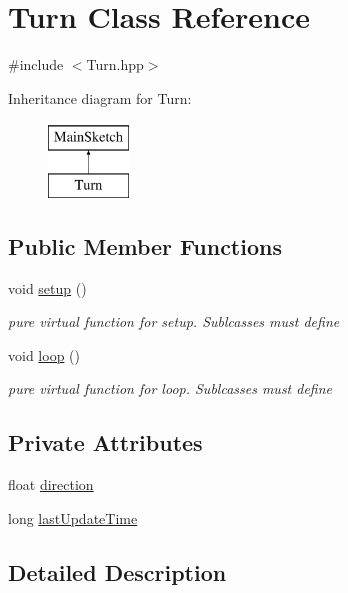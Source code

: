 \hypertarget{classTurn}{\section{Turn Class Reference}
\label{classTurn}
}


{\ttfamily \#include $<$Turn.\-hpp$>$}

Inheritance diagram for Turn\-:\begin{figure}[H]
\begin{center}
\leavevmode
\includegraphics[height=2.000000cm]{classTurn}
\end{center}
\end{figure}
\subsection*{Public Member Functions}
\begin{DoxyCompactItemize}
\item 
void \hyperlink{classTurn_a8fdb6293836d60fb74c5b4d147050373}{setup} ()
\begin{DoxyCompactList}\small\item\em pure virtual function for setup. Sublcasses must define \end{DoxyCompactList}\item 
void \hyperlink{classTurn_ae13f2a047c9ab7e4d4043c568d2fa5e3}{loop} ()
\begin{DoxyCompactList}\small\item\em pure virtual function for loop. Sublcasses must define \end{DoxyCompactList}\end{DoxyCompactItemize}
\subsection*{Private Attributes}
\begin{DoxyCompactItemize}
\item 
float \hyperlink{classTurn_a389aaac2be62ab0a1ab03d729c664e24}{direction}
\item 
long \hyperlink{classTurn_aea10c7359bfbeab45fea812356caae6b}{last\-Update\-Time}
\end{DoxyCompactItemize}


\subsection{Detailed Description}


